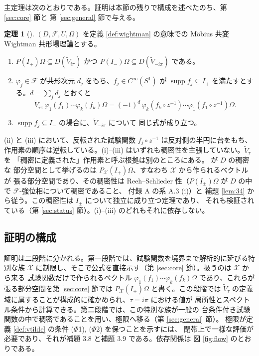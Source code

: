 \documentclass[11pt,a4paper]{article}
\newcommand{\Circ}{S^{1}}
\newcommand{\Fields}{\mathcal{F}}
\newcommand{\Xcl}{\mathcal{X}}
\newcommand{\Vt}{\widetilde{V}}
\newcommand{\Dom}{D}
\theoremstyle{definition}
\newtheorem{theorem}{定理}
\newcommand{\srcnum}[1]{\renewcommand{\thetheorem}{#1}}
\begin{document}
主定理は次のとおりである。証明は本節の残りで構成を述べたのち、第 \ref{sec:core} 節と
第 \ref{sec:general} 節で与える。

\srcnum{3.10}
\begin{theorem}[\cite{T26}]
\label{thm:main}
$(\Dom, \Fields, U, \Omega)$ を定義 \ref{def:wightman} の意味での M\"obius 共変
Wightman 共形場理論とする。
\begin{enumerate}
  \item[(i)] $P(I_+)\Omega \subseteq \Dom(\Vt_{i\pi})$ かつ
    $P(I_-)\Omega \subseteq \Dom(\Vt_{-i\pi})$ である。
  \item[(ii)] $\varphi_j \in \Fields$ が共形次元 $d_j$ をもち、$f_j \in C^\infty(\Circ)$ が
    $\operatorname{supp} f_j \subseteq I_+$ を満たすとする。$d = \sum_j d_j$ とおくと
    \[
      \Vt_{i\pi}\, \varphi_1(f_1)\cdots\varphi_k(f_k)\Omega
      = (-1)^{d}\, \varphi_k(f_k \circ z^{-1})\cdots\varphi_1(f_1 \circ z^{-1})\Omega .
    \]
  \item[(iii)] $\operatorname{supp} f_j \subseteq I_-$ の場合に、$\Vt_{-i\pi}$ について
    同じ式が成り立つ。
\end{enumerate}
\end{theorem}

(ii) と (iii) において、反転された試験関数 $f_j \circ z^{-1}$ は反対側の半円に台をもち、
作用素の順序は逆転している。(i)--(iii) はいずれも稠密性を主張していない。$\Vt_\tau$ を
「稠密に定義された」作用素と呼ぶ根拠は別のところにある。\cite{T26} が $\Dom$ の稠密な
部分空間として挙げるのは $P_\Xcl(I_+)\Omega$、すなわち $\Xcl$ から作られるベクトルが
張る部分空間であり、その稠密性は Reeh--Schlieder 性（$P(I_\pm)\Omega$ が $\Dom$ の中で
$\Fields$-強位相について稠密であること、\cite{CRTT25} 付録 A の系 A.3 (i)）と
補題 \ref{lem:34} から従う。この稠密性は $I_\pm$ について独立に成り立つ定理であり、
それも検証されている（第 \ref{sec:status} 節）。(i)--(iii) のどれもそれに依存しない。

\subsection{証明の構成}

証明は二段階に分かれる。第一段階では、試験関数を境界まで解析的に延びる特別な族
$\Xcl$ に制限し、そこで公式を直接示す（第 \ref{sec:core} 節）。扱うのは $\Xcl$ から来る
試験関数だけで作られるベクトル $\varphi_1(f_1)\cdots\varphi_k(f_k)\Omega$ であり、これらが
張る部分空間を第 \ref{sec:core} 節では $P_\Xcl(I_+)\Omega$ と書く。この段階では
$\Vt_\tau$ の定義域に属することが構成的に確かめられ、$\tau = i\pi$ における値が
局所性とスペクトル条件から計算できる。第二段階では、この特別な族が一般の
台条件付き試験関数の中で稠密であることを用い、極限へ移る（第 \ref{sec:general} 節）。
極限が定義 \ref{def:vtilde} の条件 ($\Phi$1), ($\Phi$2) を保つことを示すには、
閉帯上で一様な評価が必要であり、それが補題 3.8 と補題 3.9 である。依存関係は
図 \ref{fig:flow} のとおりである。
\end{document}

